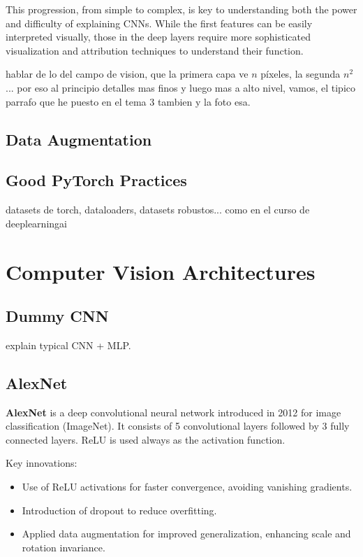 This progression, from simple to complex, is key to understanding both the power and difficulty of explaining CNNs. While the first features can be easily interpreted visually, those in the deep layers require more sophisticated visualization and attribution techniques to understand their function.

hablar de lo del campo de vision, que la primera capa ve $n$ píxeles, la segunda $n^2$... por eso al principio detalles mas finos y luego mas a alto nivel, vamos, el tipico parrafo que he puesto en el tema 3 tambien y la foto esa.

\subsection{Data Augmentation}

\subsection{Good PyTorch Practices}

datasets de torch, dataloaders, datasets robustos... como en el curso de deeplearningai

\section{Computer Vision Architectures}

\subsection{Dummy CNN}

explain typical CNN + MLP.

\subsection{AlexNet}

\textbf{AlexNet} is a deep convolutional neural network introduced in 2012 for image classification (ImageNet). It consists of 5 convolutional layers followed by 3 fully connected layers. ReLU is used always as the activation function.

Key innovations:
\begin{itemize}
    \item Use of ReLU activations for faster convergence, avoiding vanishing gradients.
    \item Introduction of dropout to reduce overfitting.
    \item Applied data augmentation for improved generalization, enhancing scale and rotation invariance.
    
\end{itemize}


